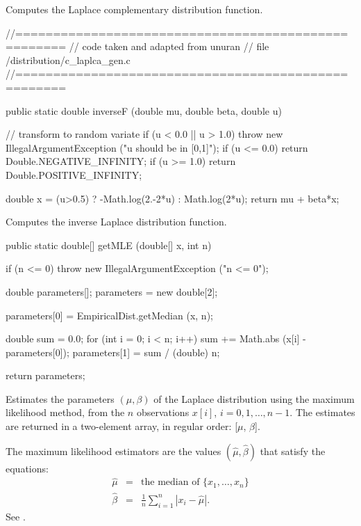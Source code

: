 \begin{tabb}
   Computes the Laplace complementary distribution function.
\end{tabb}
\begin{code}\begin{hide}
  //====================================================
  // code taken and adapted from unuran
  // file /distribution/c_laplca_gen.c
  //====================================================\end{hide}

   public static double inverseF (double mu, double beta, double u)\begin{hide} {
     // transform to random variate
     if (u < 0.0 || u > 1.0)
        throw new IllegalArgumentException ("u should be in [0,1]");
     if (u <= 0.0)
        return Double.NEGATIVE_INFINITY;
     if (u >= 1.0)
        return Double.POSITIVE_INFINITY;

     double x = (u>0.5) ? -Math.log(2.-2*u) : Math.log(2*u);
     return mu + beta*x;
   }\end{hide}
\end{code}
\begin{tabb}Computes the inverse Laplace distribution function.
\end{tabb}
\begin{code}

   public static double[] getMLE (double[] x, int n)\begin{hide} {
      if (n <= 0)
         throw new IllegalArgumentException ("n <= 0");

      double parameters[];
      parameters = new double[2];

      parameters[0] = EmpiricalDist.getMedian (x, n);

      double sum = 0.0;
      for (int i = 0; i < n; i++)
         sum += Math.abs (x[i] - parameters[0]);
      parameters[1] = sum / (double) n;

      return parameters;
   }\end{hide}
\end{code}
\begin{tabb}
  Estimates the parameters $(\mu, \beta)$ of the Laplace distribution
  using the maximum likelihood method, from the $n$ observations
   $x[i]$, $i = 0, 1,\ldots, n-1$. The estimates are returned in a two-element
    array, in regular order: [$\mu$, $\beta$].
 \begin{detailed}
   The maximum likelihood estimators are the values $(\hat\mu , \hat\beta)$
   that satisfy the equations:
 \begin{eqnarray*}
      \hat{\mu} & = & \mbox{the median of } \{x_1,\ldots,x_n\}\\
      \hat{\beta} & = & \frac{1}{n} \sum_{i=1}^{n} |x_i - \hat{\mu}|.
 \end{eqnarray*}
   See \cite[page 172]{tJOH95b}.
 \end{detailed}
\end{tabb}
